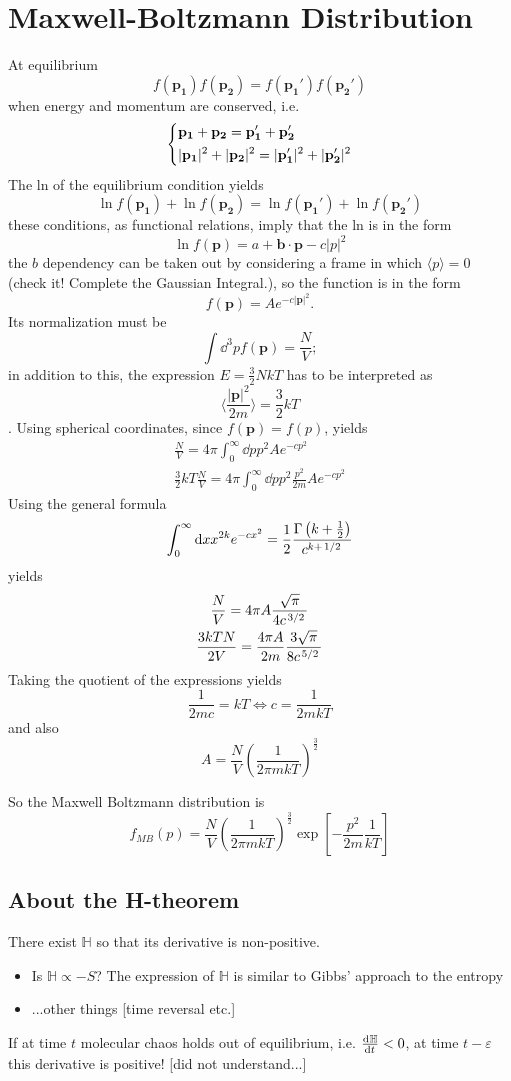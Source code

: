 \section{Maxwell-Boltzmann Distribution}
At equilibrium
$$f(\mathbf{p_1})f(\mathbf{p_2}) =f(\mathbf{p_1'})f(\mathbf{p_2'})$$
when energy and momentum are conserved, i.e.
$$\begin{dcases*}
\mathbf{p_1}+\mathbf{p_2}=\mathbf{p_1'}+\mathbf{p_2'}\\
|\mathbf{p_1}|^2+|\mathbf{p_2}|^2 = |\mathbf{p_1'}|^2+|\mathbf{p_2'}|^2
\end{dcases*}
$$
The ln of the equilibrium condition yields
$$\ln f(\mathbf{p_1})+\ln f(\mathbf{p_2})=
\ln f(\mathbf{p_1'})+\ln f(\mathbf{p_2'})$$
these conditions, as functional relations, imply that the ln is in the form
$$\ln f(\mathbf{p}) = a + \mathbf{b}\cdot\mathbf{p}-c|p|^2$$
the $b$ dependency can be taken out by considering a frame in which
$\langle p\rangle=0$ (check it! Complete the Gaussian Integral.), so the function
is in the form
$$f(\mathbf{p}) = A e^{-c|\mathbf{p}|^2}.$$
Its normalization must be
$$\int \dd ^3p f(\mathbf{p}) = \frac{N}{V};$$
in addition to this, the expression $E=\frac{3}{2}NkT$ has to be interpreted
as
$$\langle \frac{|\mathbf{p}|^2}{2m}\rangle=\frac{3}{2}kT$$.
Using spherical coordinates, since $f(\mathbf{p})=f(p)$, yields
\begin{gather*}
\frac{N}{V} = 4\pi\int_0^\infty \dd p p^2 A e^{-cp^2}\\
\frac{3}{2}kT\frac{N}{V} = 4\pi\int_0^\infty \dd p p^2 \frac{p^2}{2m}
Ae^{-cp^2}
\end{gather*}
Using the general formula
$$\int_0^\infty \dd x x^{2k} e^{-cx^2} = \frac{1}{2}\frac{\Gamma\left(k+\frac{1}{2}
\right)}{c^{k+\flatfrac{1}{2}}}$$
yields
\begin{gather*}
\frac{N}{V}=4\pi A\frac{\sqrt{\pi}}{4c^{\flatfrac{3}{2}}}\\
\frac{3kTN}{2V} = \frac{4\pi A}{2m}\frac{3\sqrt{\pi}}{8c^{\flatfrac{5}{2}}}
\end{gather*}
Taking the quotient of the expressions yields
$$\frac{1}{2mc}=kT\iff c = \frac{1}{2mkT}$$
and also
$$A = \frac{N}{V} \left(\frac{1}{2\pi mkT}\right)^{\frac{3}{2}}$$

So the Maxwell Boltzmann distribution is
$$f_{MB}(p) = \frac{N}{V}\left(\frac{1}{2\pi mkT}\right)^\frac{3}{2}\exp\left[
-\frac{p^2}{2m}\frac{1}{kT}\right]$$

\subsection{About the H-theorem}
There exist $\mathbb{H}$ so that its derivative is non-positive.
\begin{itemize}
    \item Is $\mathbb{H}\propto-S$? The expression of $\mathbb{H}$ is similar
        to Gibbs' approach to the entropy
    \item ...other things [time reversal etc.]
\end{itemize}
If at time $t$ molecular chaos holds out of equilibrium, i.e.
$\dv[]{\mathbb{H}}{t}<0$, at time $t-\varepsilon$ this derivative is positive!
[did not understand...]

